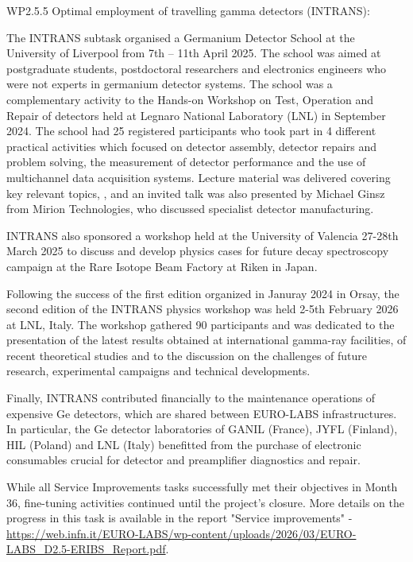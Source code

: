 WP2.5.5 Optimal employment of travelling gamma detectors (INTRANS):

The INTRANS subtask organised a Germanium Detector School at the University of Liverpool from 7th – 11th April 2025. The school was aimed at postgraduate students, postdoctoral researchers and electronics engineers who were not experts in germanium detector systems. The school was a complementary activity to the Hands-on Workshop on Test, Operation and Repair of detectors held at Legnaro National Laboratory (LNL) in September 2024. The school had 25 registered participants who took part in 4 different practical activities which focused on detector assembly, detector repairs and problem solving, the measurement of detector performance and the use of multichannel data acquisition systems. Lecture material was delivered covering key relevant topics, , and an invited talk was also presented by Michael Ginsz from Mirion Technologies, who discussed specialist detector manufacturing.

INTRANS also sponsored a workshop held at the University of Valencia 27-28th March 2025 to discuss and develop physics cases for future decay spectroscopy campaign at the Rare Isotope Beam Factory at Riken in Japan. 

Following the success of the first edition organized in Januray 2024 in Orsay, the second edition of the INTRANS physics workshop was held 2-5th February 2026 at LNL, Italy. The workshop gathered 90 participants and was dedicated to the presentation of the latest results obtained at international gamma-ray facilities, of recent theoretical studies and to the discussion on the challenges of future research, experimental campaigns and technical developments.

Finally, INTRANS contributed financially to the maintenance operations of expensive Ge detectors, which are shared between EURO-LABS infrastructures. In particular, the Ge detector laboratories of GANIL (France), JYFL (Finland), HIL (Poland) and LNL (Italy) benefitted from the purchase of electronic consumables crucial for detector and preamplifier diagnostics and repair.



While all Service Improvements tasks successfully met their objectives in Month 36, fine-tuning activities continued until the project's closure. More details on the progress in this task is available in the report "Service improvements" - \url{https://web.infn.it/EURO-LABS/wp-content/uploads/2026/03/EURO-LABS_D2.5-ERIBS_Report.pdf}.




